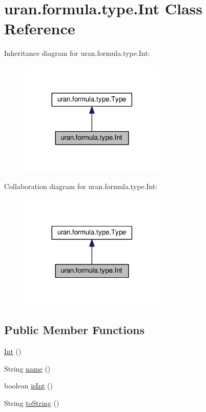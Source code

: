 \hypertarget{classuran_1_1formula_1_1type_1_1_int}{}\section{uran.\+formula.\+type.\+Int Class Reference}
\label{classuran_1_1formula_1_1type_1_1_int}


Inheritance diagram for uran.\+formula.\+type.\+Int\+:
\nopagebreak
\begin{figure}[H]
\begin{center}
\leavevmode
\includegraphics[width=197pt]{classuran_1_1formula_1_1type_1_1_int__inherit__graph}
\end{center}
\end{figure}


Collaboration diagram for uran.\+formula.\+type.\+Int\+:
\nopagebreak
\begin{figure}[H]
\begin{center}
\leavevmode
\includegraphics[width=197pt]{classuran_1_1formula_1_1type_1_1_int__coll__graph}
\end{center}
\end{figure}
\subsection*{Public Member Functions}
\begin{DoxyCompactItemize}
\item 
\hyperlink{classuran_1_1formula_1_1type_1_1_int_aea0ad46892976650be418935cbaed096}{Int} ()
\item 
String \hyperlink{classuran_1_1formula_1_1type_1_1_int_ab9e4d8cbc83dab11f15b6d38930f2699}{name} ()
\item 
boolean \hyperlink{classuran_1_1formula_1_1type_1_1_int_aa672bea374613f142e10cf58159e8342}{is\+Int} ()
\item 
String \hyperlink{classuran_1_1formula_1_1type_1_1_int_a51cd4bd2b0dc21484b293994ce070ad5}{to\+String} ()
\end{DoxyCompactItemize}
